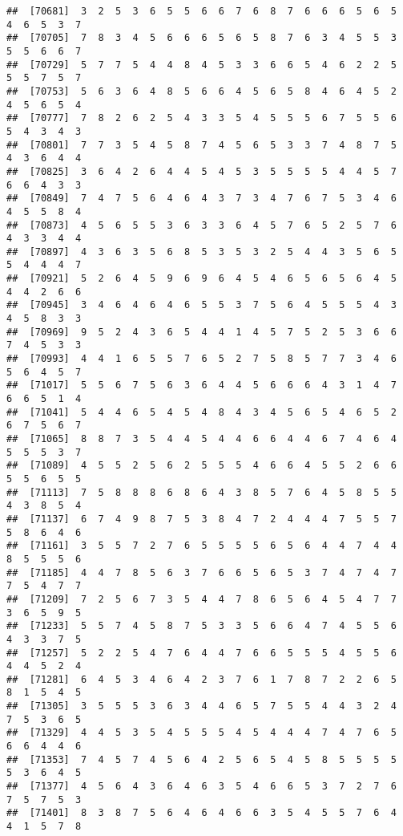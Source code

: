 \documentclass[
]{book}
\begin{document}
\begin{verbatim}
##  [70681]  3  2  5  3  6  5  5  6  6  7  6  8  7  6  6  6  5  6  5  4  6  5  3  7
##  [70705]  7  8  3  4  5  6  6  6  5  6  5  8  7  6  3  4  5  5  3  5  5  6  6  7
##  [70729]  5  7  7  5  4  4  8  4  5  3  3  6  6  5  4  6  2  2  5  5  5  7  5  7
##  [70753]  5  6  3  6  4  8  5  6  6  4  5  6  5  8  4  6  4  5  2  4  5  6  5  4
##  [70777]  7  8  2  6  2  5  4  3  3  5  4  5  5  5  6  7  5  5  6  5  4  3  4  3
##  [70801]  7  7  3  5  4  5  8  7  4  5  6  5  3  3  7  4  8  7  5  4  3  6  4  4
##  [70825]  3  6  4  2  6  4  4  5  4  5  3  5  5  5  5  4  4  5  7  6  6  4  3  3
##  [70849]  7  4  7  5  6  4  6  4  3  7  3  4  7  6  7  5  3  4  6  4  5  5  8  4
##  [70873]  4  5  6  5  5  3  6  3  3  6  4  5  7  6  5  2  5  7  6  4  3  3  4  4
##  [70897]  4  3  6  3  5  6  8  5  3  5  3  2  5  4  4  3  5  6  5  5  4  4  4  7
##  [70921]  5  2  6  4  5  9  6  9  6  4  5  4  6  5  6  5  6  4  5  4  4  2  6  6
##  [70945]  3  4  6  4  6  4  6  5  5  3  7  5  6  4  5  5  5  4  3  4  5  8  3  3
##  [70969]  9  5  2  4  3  6  5  4  4  1  4  5  7  5  2  5  3  6  6  7  4  5  3  3
##  [70993]  4  4  1  6  5  5  7  6  5  2  7  5  8  5  7  7  3  4  6  5  6  4  5  7
##  [71017]  5  5  6  7  5  6  3  6  4  4  5  6  6  6  4  3  1  4  7  6  6  5  1  4
##  [71041]  5  4  4  6  5  4  5  4  8  4  3  4  5  6  5  4  6  5  2  6  7  5  6  7
##  [71065]  8  8  7  3  5  4  4  5  4  4  6  6  4  4  6  7  4  6  4  5  5  5  3  7
##  [71089]  4  5  5  2  5  6  2  5  5  5  4  6  6  4  5  5  2  6  6  5  5  6  5  5
##  [71113]  7  5  8  8  8  6  8  6  4  3  8  5  7  6  4  5  8  5  5  4  3  8  5  4
##  [71137]  6  7  4  9  8  7  5  3  8  4  7  2  4  4  4  7  5  5  7  5  8  6  4  6
##  [71161]  3  5  5  7  2  7  6  5  5  5  5  6  5  6  4  4  7  4  4  8  5  5  5  6
##  [71185]  4  4  7  8  5  6  3  7  6  6  5  6  5  3  7  4  7  4  7  7  5  4  7  7
##  [71209]  7  2  5  6  7  3  5  4  4  7  8  6  5  6  4  5  4  7  7  3  6  5  9  5
##  [71233]  5  5  7  4  5  8  7  5  3  3  5  6  6  4  7  4  5  5  6  4  3  3  7  5
##  [71257]  5  2  2  5  4  7  6  4  4  7  6  6  5  5  5  4  5  5  6  4  4  5  2  4
##  [71281]  6  4  5  3  4  6  4  2  3  7  6  1  7  8  7  2  2  6  5  8  1  5  4  5
##  [71305]  3  5  5  5  3  6  3  4  4  6  5  7  5  5  4  4  3  2  4  7  5  3  6  5
##  [71329]  4  4  5  3  5  4  5  5  5  4  5  4  4  4  7  4  7  6  5  6  6  4  4  6
##  [71353]  7  4  5  7  4  5  6  4  2  5  6  5  4  5  8  5  5  5  5  5  3  6  4  5
##  [71377]  4  5  6  4  3  6  4  6  3  5  4  6  6  5  3  7  2  7  6  7  5  7  5  3
##  [71401]  8  3  8  7  5  6  4  6  4  6  6  3  5  4  5  5  7  6  4  4  1  5  7  8

\end{verbatim}
\end{document}
